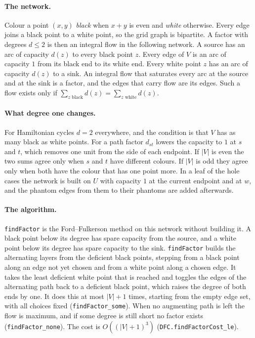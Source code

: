 \documentclass[11pt]{article}
\theoremstyle{plain}
\theoremstyle{definition}
\theoremstyle{remark}
\newcommand{\lean}[1]{\texttt{#1}}
\begin{document}
\paragraph{The network.}
Colour a point $(x,y)$ \emph{black} when $x+y$ is even and \emph{white} otherwise.
Every edge joins a black point to a white point, so the grid graph is bipartite.
A factor with degrees $d\le2$ is then an integral flow in the following network.
A source has an arc of capacity $d(z)$ to every black point $z$.
Every edge of $V$ is an arc of capacity $1$ from its black end to its white end.
Every white point $z$ has an arc of capacity $d(z)$ to a sink.
An integral flow that saturates every arc at the source and at the sink is a factor, and the edges
that carry flow are its edges.
Such a flow exists only if $\sum_{z\text{ black}}d(z)=\sum_{z\text{ white}}d(z)$.

\paragraph{What degree one changes.}
For Hamiltonian cycles $d=2$ everywhere, and the condition is that $V$ has as many black as white
points.
For a path factor $d_{st}$ lowers the capacity to $1$ at $s$ and $t$, which removes one unit from
the side of each endpoint.
If $|V|$ is even the two sums agree only when $s$ and $t$ have different colours.
If $|V|$ is odd they agree only when both have the colour that has one point more.
In a leaf of the hole cases the network is built on $U$ with capacity $1$ at the current endpoint and
at $w$, and the phantom edges from them to their phantoms are added afterwards.

\paragraph{The algorithm.}
\lean{findFactor} is the Ford--Fulkerson method on this network without building it.
A black point below its degree has spare capacity from the source, and a white point below its
degree has spare capacity to the sink.
\lean{findFactor} builds the alternating layers from the deficient black points, stepping from a
black point along an edge not yet chosen and from a white point along a chosen edge.
It takes the least deficient white point that is reached and toggles the edges of the alternating
path back to a deficient black point, which raises the degree of both ends by one.
It does this at most $|V|+1$ times, starting from the empty edge set, with all choices fixed
(\lean{findFactor\_some}).
When no augmenting path is left the flow is maximum, and if some degree is still short no factor
exists (\lean{findFactor\_none}).
The cost is $O((|V|+1)^3)$ (\lean{DFC.findFactorCost\_le}).
\end{document}
